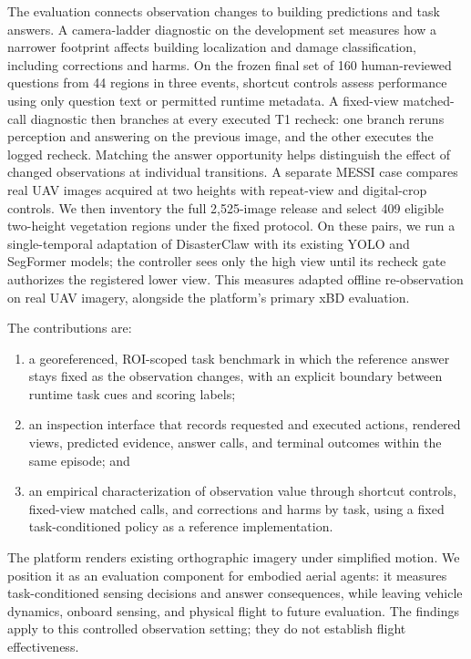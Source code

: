 The evaluation connects observation changes to building predictions and task answers. A camera-ladder diagnostic on the development set measures how a narrower footprint affects building localization and damage classification, including corrections and harms. On the frozen final set of 160 human-reviewed questions from 44 regions in three events, shortcut controls assess performance using only question text or permitted runtime metadata. A fixed-view matched-call diagnostic then branches at every executed T1 recheck: one branch reruns perception and answering on the previous image, and the other executes the logged recheck. Matching the answer opportunity helps distinguish the effect of changed observations at individual transitions. A separate MESSI case compares real UAV images acquired at two heights with repeat-view and digital-crop controls. We then inventory the full 2,525-image release and select 409 eligible two-height vegetation regions under the fixed protocol. On these pairs, we run a single-temporal adaptation of DisasterClaw with its existing YOLO and SegFormer models; the controller sees only the high view until its recheck gate authorizes the registered lower view. This measures adapted offline re-observation on real UAV imagery, alongside the platform's primary xBD evaluation.

The contributions are:
\begin{enumerate}
\item a georeferenced, ROI-scoped task benchmark in which the reference answer stays fixed as the observation changes, with an explicit boundary between runtime task cues and scoring labels;
\item an inspection interface that records requested and executed actions, rendered views, predicted evidence, answer calls, and terminal outcomes within the same episode; and
\item an empirical characterization of observation value through shortcut controls, fixed-view matched calls, and corrections and harms by task, using a fixed task-conditioned policy as a reference implementation.
\end{enumerate}

The platform renders existing orthographic imagery under simplified motion. We position it as an evaluation component for embodied aerial agents: it measures task-conditioned sensing decisions and answer consequences, while leaving vehicle dynamics, onboard sensing, and physical flight to future evaluation. The findings apply to this controlled observation setting; they do not establish flight effectiveness.
